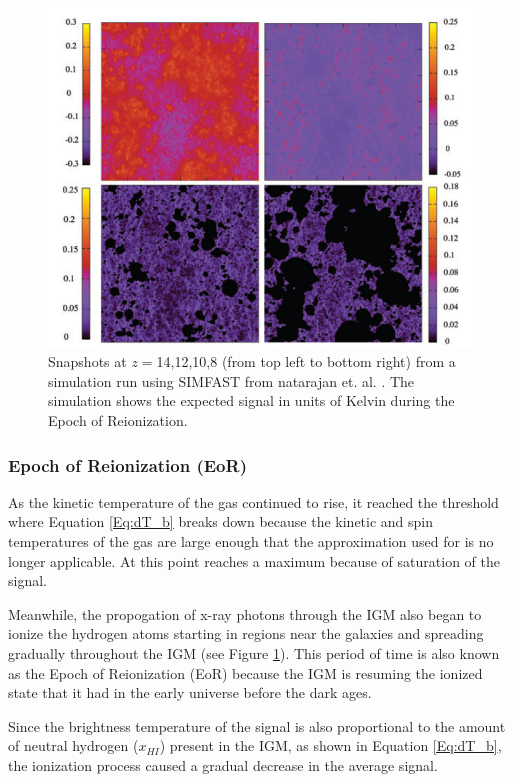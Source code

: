 \begin{figure}[htb]
\begin{center}
\includegraphics[width=0.95\linewidth]{Introduction/figures/reionization.jpg}
\caption{Snapshots at $z=$14,12,10,8 (from top left to bottom right) from a simulation run using SIMFAST from natarajan et. al. \cite{natarajan_2014}. The simulation shows the expected \dtb signal in units of Kelvin during the Epoch of Reionization. }
\label{Fig:eor}
\end{center}
\end{figure}

\subsubsection{Epoch of Reionization (EoR)}
As the kinetic temperature of the gas continued to rise, it reached the threshold where Equation \ref{Eq:dT_b} breaks down because the kinetic and spin temperatures of the gas are large enough that the approximation used for \tu is no longer applicable. At this point \dtb reaches a maximum because of saturation of the signal. 

Meanwhile, the propogation of x-ray photons through the IGM also began to ionize the hydrogen atoms starting in regions near the galaxies and spreading gradually throughout the IGM (see Figure \ref{Fig:eor}). This period of time is also known as the Epoch of Reionization (EoR) because the IGM is resuming the ionized state that it had in the early universe before the dark ages. 

Since the brightness temperature of the \cm signal is also proportional to the amount of neutral hydrogen ($x_{HI}$) present in the IGM, as shown in Equation \ref{Eq:dT_b}, the ionization process caused a gradual decrease in the average \cm signal. 

